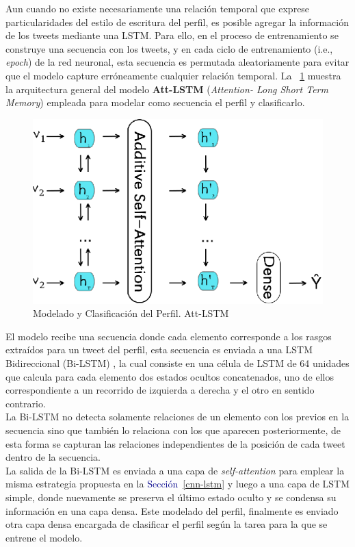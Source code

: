 	Aun cuando no existe necesariamente una relación temporal que exprese particularidades del estilo de escritura del perfil, es posible agregar la información de los tweets mediante una LSTM. Para ello, en el proceso de entrenamiento se construye una secuencia con los tweets, y en cada ciclo de entrenamiento (i.e., \textit{epoch}) de la red neuronal, esta secuencia es permutada aleatoriamente para evitar que el modelo capture erróneamente cualquier relación temporal. La \figurename~\ref{att_lstm} muestra la arquitectura general del modelo \textbf{Att-LSTM} (\textit{Attention- Long Short Term Memory}) empleada para modelar como secuencia el perfil y clasificarlo.
	
	\begin{figure}[!thb]
		\begin{center}
			\includegraphics[]{images/att_lstm.eps}
		\end{center}	
		\caption[Att - LSTM]{Modelado y Clasificación del Perfil. Att-LSTM}
		\label{att_lstm}
	\end{figure}
	
	El modelo recibe una secuencia donde cada elemento corresponde a los rasgos extraídos para un tweet del perfil, esta secuencia es enviada a una LSTM Bidireccional (Bi-LSTM) \citep{DBLP:journals/tsp/SchusterP97}, la cual consiste en una célula de LSTM de 64 unidades que calcula para cada elemento dos estados ocultos concatenados, uno de ellos correspondiente a un recorrido de izquierda a derecha y el otro en sentido contrario.
	\\
	La Bi-LSTM no detecta solamente relaciones de un elemento con los previos en la secuencia sino que también lo relaciona con los que aparecen posteriormente, de esta forma se capturan las relaciones independientes de la posición de cada tweet dentro de la secuencia.
	\\ 
	La salida de la Bi-LSTM es enviada a una capa de \textit{self-attention} para emplear la misma estrategia propuesta en la \textcolor{darkblue}{Sección~\ref{cnn-lstm}} y luego a una capa de LSTM simple, donde nuevamente se preserva el último estado oculto y se condensa su información en una capa densa. Este modelado del perfil, finalmente es enviado otra capa densa encargada de clasificar el perfil según la tarea para la que se entrene el modelo.
	
